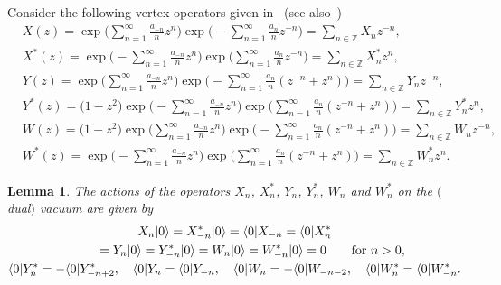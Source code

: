 \documentclass[10pt,a4paper]{amsart}
\numberwithin{equation}{section}
\newtheorem{Lemma}[Theorem]{Lemma}
\begin{document}
Consider the following vertex operators given in~\cite{Ba1996,JN2015} (see also~\cite{SZ2006})
\begin{align}
&X(z)=\exp\Biggl(\sum^\infty_{n=1}\frac{a_{-n}}{n}z^n\Biggr)\exp\Biggl(-\sum^\infty_{n=1}\frac{a_n}{n}z^{-n}\Biggr)=\sum_{n\in \mathbb{Z}}X_nz^{-n},\nonumber\\
&X^*(z)=\exp\Biggl(-\sum^\infty_{n=1}\frac{a_{-n}}{n}z^n\Biggr)\exp\Biggl(\sum^\infty_{n=1}\frac{a_n}{n}z^{-n}\Biggr)=\sum_{n\in \mathbb{Z}}X^*_nz^n,\nonumber\\
&Y(z)=\exp\Biggl(\sum^\infty_{n=1}\frac{a_{-n}}{n}z^n\Biggr)\exp\Biggl(-\sum^\infty_{n=1}\frac{a_n}{n}(z^{-n}+z^n)\Biggr)=\sum_{n\in \mathbb{Z}}Y_nz^{-n},\nonumber\\
&Y^*(z)=\big(1-z^2\big)\exp\Biggl(-\sum^\infty_{n=1}\frac{a_{-n}}{n}z^n\Biggr)\exp\Biggl(\sum^\infty_{n=1}\frac{a_n}{n}(z^{-n}+z^n)\Biggr)=\sum_{n\in \mathbb{Z}}Y^*_nz^n,\nonumber\\
&W(z)=\big(1-z^2\big)\exp\Biggl(\sum^\infty_{n=1}\frac{a_{-n}}{n}z^n\Biggr)\exp\Biggl(-\sum^\infty_{n=1}\frac{a_n}{n}(z^{-n}+z^n)\Biggr)=\sum_{n\in \mathbb{Z}}W_nz^{-n},\nonumber\\
&W^*(z)=\exp\Biggl(-\sum^\infty_{n=1}\frac{a_{-n}}{n}z^n\Biggr)\exp\Biggl(\sum^\infty_{n=1}\frac{a_n}{n}(z^{-n}+z^n)\Biggr)=\sum_{n\in \mathbb{Z}}W^*_nz^n. \label{e:ve1}
\end{align}
\begin{Lemma}The actions of the operators $X_n$, $X^*_n$, $Y_n$, $Y^*_n$, $W_n$ and $W^*_n$ on the $($dual$)$ vacuum are given by
\begin{gather}
X_n|0\rangle=X^*_{-n}|0\rangle=\langle 0|X_{-n}=\langle 0|X^*_n \nonumber\\
\label{e:re1} \hphantom{X_n|0\rangle}{}
=Y_n|0\rangle=Y^*_{-n}|0\rangle=W_n|0\rangle=W^*_{-n}|0\rangle=0 \qquad \text{for}~n>0,\\
\label{e:re2}\langle 0|Y^*_n=-\langle 0|Y^*_{-n+2},\quad \langle 0|Y_n=\langle 0|Y_{-n},\quad \langle 0|W_n=-\langle 0|W_{-n-2},\quad \langle 0|W^*_n=\langle 0|W^*_{-n}.
\end{gather}
\end{Lemma}
\end{document}
